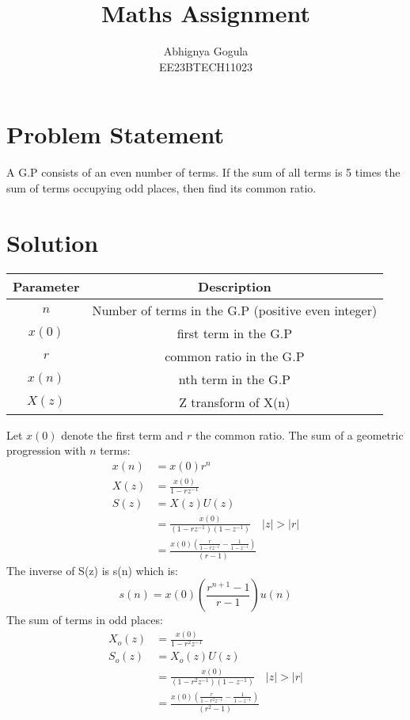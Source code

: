 \documentclass{article}
\begin{document}
\title{Maths Assignment}
\author{Abhignya Gogula\\
        EE23BTECH11023}
\maketitle
\section*{Problem Statement}
A G.P consists of an even number of terms. If the sum of all terms is 5 times the sum of terms occupying odd places, then find its common ratio.
\section*{Solution}
\begin{table}[h!]
\centering
\begin{tabular}{|c|c|}
\hline
Parameter & Description \\
\hline
\( n \) & Number of terms in the G.P (positive even integer) \\
\hline
\(x(0) \) & first term in the G.P \\
\hline
\( r \) & common ratio in the G.P \\
\hline
\( x(n) \) & nth term in the G.P \\
\hline
\( X(z) \) & Z transform of X(n) \\
\hline
\end{tabular}
\end{table}
Let \( x(0) \) denote the first term and \( r \) the common ratio. The sum of a geometric progression with \( n \) terms:
\begin{align}
x(n) &= x(0)r^n \\
X(z) &= \frac{x(0)}{1-rz^{-1}} \\
S(z) &= X(z)U(z) \\
     &= \frac{x(0)}{(1-rz^{-1})(1-z^{-1})} \quad \lvert z \rvert > \lvert r \rvert \\
     &= \frac{x(0)(\frac{r}{1-rz^{-1}}-\frac{1}{1-z^{-1}})}{(r-1)}
\end{align}
The inverse of S(z) is s(n) which is:
\begin{equation}
s(n) = x(0)(\frac{r^{n+1}-1}{r-1})u(n)
\label{eq:eq1}
\end{equation}
The sum of terms in odd places:
\begin{align}
X_o(z) &= \frac{x(0)}{1-r^2z^{-1}} \\
S_o(z) &= X_o(z)U(z) \\
       &= \frac{x(0)}{(1-r^2z^{-1})(1-z^{-1})} \quad \lvert z \rvert > \lvert r \rvert \\
       &= \frac{x(0)\left(\frac{r}{1-r^2z^{-1}}-\frac{1}{1-z^{-1}}\right)}{(r^2-1)}
\end{align}
\end{document}
